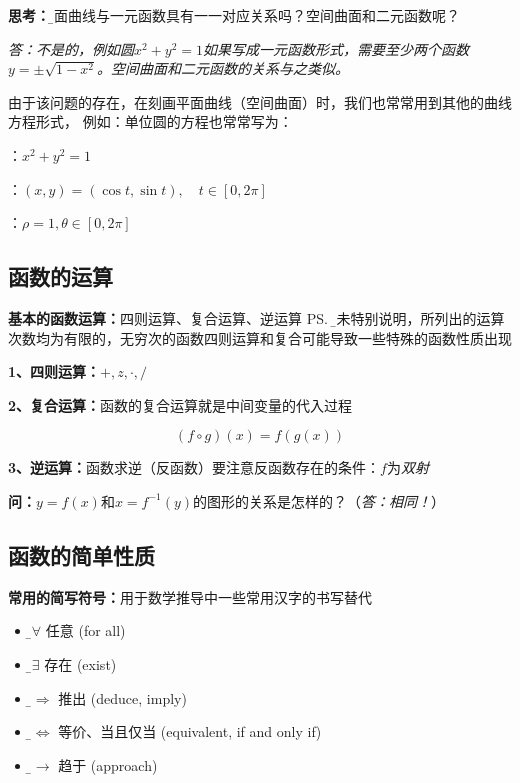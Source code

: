 	{\bf 思考：}{\b 平面曲线与一元函数具有一一对应关系吗？}空间曲面和二元函数呢？
	
	{\it 答：不是的，例如圆$x^2+y^2=1$如果写成一元函数形式，需要至少两个函数
	$y=\pm\sqrt{1-x^2}$。空间曲面和二元函数的关系与之类似。
	
	由于该问题的存在，在刻画平面曲线（空间曲面）时，我们也常常用到其他的曲线方程形式，
	例如：单位圆的方程也常常写为：
	\begin{description}
  		\setlength{\itemindent}{1cm}
		\item[隐函数方程]：$x^2+y^2=1$
		\item[参数方程]：$(x,y)=(\cos t,\sin t),\quad t\in[0,2\pi]$
		\item[极坐标方程]：$\rho=1,\theta\in[0,2\pi]$
	\end{description}
	}	
	
\subsection{函数的运算}

{\bf 基本的函数运算：}四则运算、复合运算、逆运算	
\ps{\b 如未特别说明，所列出的运算次数均为有限的，无穷次的函数四则运算和复合可能导致一些特殊的函数性质出现}

{\bf 1、四则运算：}$+,z,\cdot,/$

% 

{\bf 2、复合运算：}函数的复合运算就是中间变量的代入过程%

$$(f\circ g)(x)=f(g(x))$$


{\bf 3、逆运算：}函数求逆（反函数）要注意反函数存在的条件：$f$为{\it 双射}

{\bf 问：}$y=f(x)$和$x=f^{-1}(y)$的图形的关系是怎样的？（{\it 答：相同！}）

\subsection{函数的简单性质}
	
\begin{shaded}
	{\bf 常用的简写符号：}用于数学推导中一些常用汉字的书写替代
	\begin{itemize}
	  \item {\b$\bm{\forall}$} \quad 任意 (for all)
	  \item {\b$\bm{\exists}$} \quad 存在 (exist)
	  \item {\b$\bm{\Rightarrow}$} \quad 推出 (deduce, imply)
	  \item {\b$\bm{\Leftrightarrow}$} \quad 等价、当且仅当 (equivalent, if and only if)
	  \item {\b$\bm{\to}$} \quad 趋于 (approach)
	\end{itemize}
\end{shaded}

